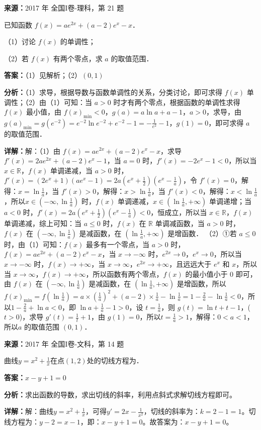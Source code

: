 \begin{question}[points=12]
\textbf{来源：}2017 年 全国I卷-理科，第 21 题\par
已知函数 $f(x)=ae^{2x}+(a-2)e^x-x$．

（1）讨论 $f(x)$ 的单调性；

（2）若 $f(x)$ 有两个零点，求 $a$ 的取值范围．
\begin{solution}
\textbf{答案：}（1）见解析；（2）$(0,1)$

\textbf{分析：}（1）求导，根据导数与函数单调性的关系，分类讨论，即可求得 $f(x)$ 单调性；（2）由（1）可知：当 $a>0$ 时才有两个零点，根据函数的单调性求得 $f(x)$ 最小值，由 $f(x)_{\min}<0$，$g(a)=a\ln a+a-1$，$a>0$，求导，由 $g(a)_{\min}=g(e^{-2})=e^{-2}\ln e^{-2}+e^{-2}-1=-\frac{1}{e^2}-1$，$g(1)=0$，即可求得 $a$ 的取值范围．

\textbf{详解：}解：（1）由 $f(x)=ae^{2x}+(a-2)e^x-x$，求导 $f'(x)=2ae^{2x}+(a-2)e^x-1$，当 $a=0$ 时，$f'(x)=-2e^x-1<0$，所以当 $x\in\mathbb{R}$，$f(x)$ 单调递减，当 $a>0$ 时，$f'(x)=(2e^x+1)(ae^x-1)=2a(e^x+\frac{1}{2})(e^x-\frac{1}{a})$，令 $f'(x)=0$，解得：$x=\ln\frac{1}{a}$，当 $f'(x)>0$，解得：$x>\ln\frac{1}{a}$，当 $f'(x)<0$，解得：$x<\ln\frac{1}{a}$，所以$x\in(-\infty,\ln\frac{1}{a})$ 时，$f(x)$ 单调递减，$x\in(\ln\frac{1}{a},+\infty)$ 单调递增；当 $a<0$ 时，$f'(x)=2a(e^x+\frac{1}{2})(e^x-\frac{1}{a})<0$，恒成立，所以当 $x\in\mathbb{R}$，$f(x)$ 单调递减，综上可知：当 $a\leq0$ 时，$f(x)$ 在 $\mathbb{R}$ 单调减函数，当 $a>0$ 时，$f(x)$ 在 $(-\infty,\ln\frac{1}{a})$ 是减函数，在 $(\ln\frac{1}{a},+\infty)$ 是增函数．
（2）①若 $a\leq0$ 时，由（1）可知：$f(x)$ 最多有一个零点，当 $a>0$ 时，$f(x)=ae^{2x}+(a-2)e^x-x$，当 $x\to-\infty$ 时，$e^{2x}\to0$，$e^x\to0$，所以当 $x\to-\infty$ 时，$f(x)\to+\infty$，当 $x\to\infty$，$e^{2x}\to+\infty$，且远远大于 $e^x$ 和 $x$，所以当 $x\to\infty$，$f(x)\to+\infty$，所以函数有两个零点，$f(x)$ 的最小值小于 0 即可，由 $f(x)$ 在 $(-\infty,\ln\frac{1}{a})$ 是减函数，在 $(\ln\frac{1}{a},+\infty)$ 是增函数，所以$f(x)_{\min}=f(\ln\frac{1}{a})=a\times(\frac{1}{a})^2+(a-2)\times\frac{1}{a}-\ln\frac{1}{a}=1-\frac{2}{a}-\ln\frac{1}{a}<0$，所以$1-\frac{2}{a}+\ln a<0$，即 $\ln a+\frac{1}{a}-1>0$，设 $t=\frac{1}{a}$，则 $g(t)=\ln t+t-1$，($t>0$)，求导 $g'(t)=\frac{1}{t}+1$，由 $g(1)=0$，所以$t=\frac{1}{a}>1$，解得：$0<a<1$，所以$a$ 的取值范围 $(0,1)$．
\end{solution}
\end{question}

\begin{question}[points=5]
\textbf{来源：}2017 年 全国I卷-文科，第 14 题\par
曲线$y=x^2+\frac{1}{x}$在点$(1,2)$处的切线方程为．
\fillin[{$x-y+1=0$}]
\begin{solution}
\textbf{答案：}$x-y+1=0$

\textbf{分析：}求出函数的导数，求出切线的斜率，利用点斜式求解切线方程即可。

\textbf{详解：}解：曲线$y=x^2+\frac{1}{x}$，可得$y'=2x-\frac{1}{x^2}$，切线的斜率为：$k=2-1=1$。切线方程为：$y-2=x-1$，即：$x-y+1=0$。故答案为：$x-y+1=0$。
\end{solution}
\end{question}

